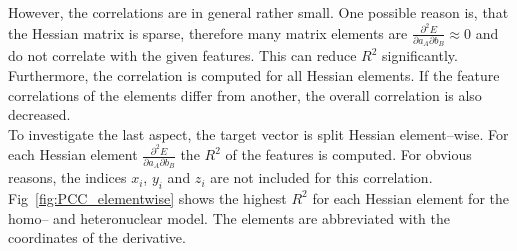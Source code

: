 However, the correlations are in general rather small.
One possible reason is, that the Hessian matrix is sparse, therefore many matrix elements are $\frac{\partial^2 E}{\partial a_A \partial b_B} \approx 0$
and do not correlate with the given features. This can reduce $R^2$ significantly.
Furthermore, the correlation is computed for all Hessian elements.
If the feature correlations of the elements differ from another, the overall correlation is also decreased.\\
To investigate the last aspect, the target vector is split Hessian element--wise. 
For each Hessian element $\frac{\partial^2 E}{\partial a_A \partial b_B}$ the $R^2$ of the features is computed.
For obvious reasons, the indices $x_i$, $y_i$ and $z_i$ are not included for this correlation.
Fig~\ref{fig:PCC_elementwise} shows the highest $R^2$ for each Hessian element for the homo-- and heteronuclear model.
The elements are abbreviated with the coordinates of the derivative.

